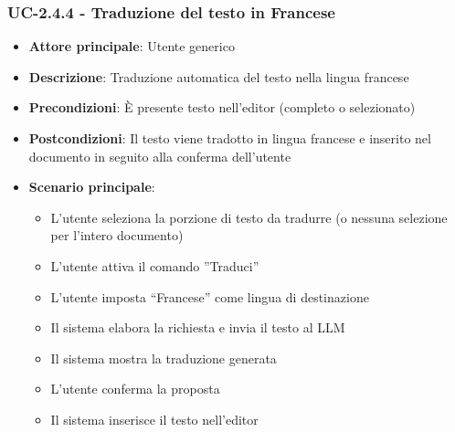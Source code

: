\documentclass[11pt,a4paper]{article}
\begin{document}
\subsubsection{UC-2.4.4 - Traduzione del testo in Francese}
    \begin{itemize}
    \item \textbf{Attore principale}: Utente generico
    \item \textbf{Descrizione}: Traduzione automatica del testo nella lingua francese
    \item \textbf{Precondizioni}: È presente testo nell’editor (completo o selezionato)
    \item \textbf{Postcondizioni}: Il testo viene tradotto in lingua francese e inserito nel documento in seguito alla conferma dell'utente
    \item \textbf{Scenario principale}:
    \begin{itemize}
        \item L’utente seleziona la porzione di testo da tradurre (o nessuna selezione per l'intero documento)
        \item L’utente attiva il comando ”Traduci”
        \item L’utente imposta “Francese” come lingua di destinazione
        \item Il sistema elabora la richiesta e invia il testo al LLM
        \item Il sistema mostra la traduzione generata
        \item L'utente conferma la proposta
        \item Il sistema inserisce il testo nell'editor
    \end{itemize}
\end{itemize}
\end{document}
